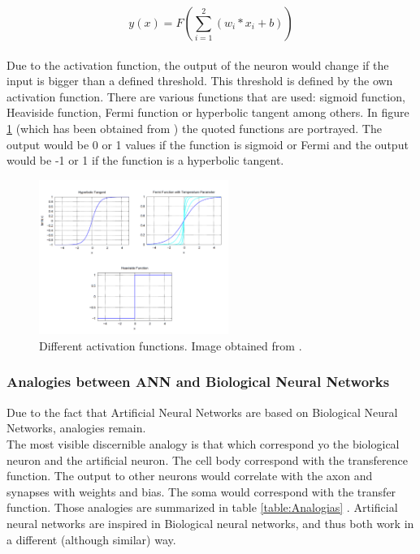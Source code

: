 			\begin{equation}
			y(x)=F(\sum_{i=1}^{2} (w_{i}*x_{i} + b) )
			\label{eq:ecuation_neuronasencilla}
			\end{equation}\\

Due to the activation function, the output of the neuron would change if the input is bigger than a defined threshold. This threshold is defined by the own activation function. There are various functions that are used: sigmoid function, Heaviside function, Fermi function or hyperbolic tangent among others. In figure \ref{fig:activation_function} (which has been obtained from \cite{BINN}) the quoted functions are portrayed. The output would be 0 or 1 values if the function is sigmoid or Fermi and the output would be -1 or 1 if the function is a hyperbolic tangent. \\

\begin{figure}[htb]
\centering
\includegraphics[width=0.55\textwidth]{images_miscelaneus/activation_function.PNG}
\caption{Different activation functions. Image obtained from \cite{BINN}.} \label{fig:activation_function}
\end{figure}

\subsubsection{Analogies between ANN and Biological Neural Networks}
Due to the fact that Artificial Neural Networks are based on Biological Neural Networks, analogies remain.\\

The most visible discernible analogy is that which correspond yo the biological neuron and the artificial neuron. The cell body correspond with the transference function. The output to other neurons would correlate with the axon and synapses with weights and bias. The soma would correspond with the transfer function. Those analogies are summarized in table \ref{table:Analogias} \cite{Analogies}. Artificial neural networks are inspired in Biological neural networks, and thus both work in a different (although similar) way.\\

